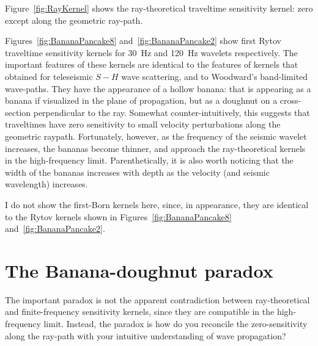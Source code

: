 \par
Figure~\ref{fig:RayKernel} shows the ray-theoretical traveltime
sensitivity kernel: zero except along the geometric ray-path.  

\par
Figures~\ref{fig:BananaPancake8} and~\ref{fig:BananaPancake2} show
first Rytov traveltime sensitivity kernels for 30~Hz and 120~Hz
wavelets respectively.  The important features of these kernels are
identical to the features of kernels that \cite{marquering99}
obtained for teleseismic $S-H$ wave scattering, and to Woodward's
 band-limited wave-paths.  They have the
appearance of a  hollow banana: that is appearing as a banana if
visualized in the plane of propagation, but as a doughnut on a
cross-section perpendicular to the ray.  
Somewhat counter-intuitively, this suggests that traveltimes
have zero sensitivity to small velocity perturbations along the
geometric raypath.  
Fortunately, however, as the frequency of the seismic wavelet increases,
the bananas become thinner, and approach the ray-theoretical kernels
in the high-frequency limit.
Parenthetically, it is also worth noticing that the width of the
bananas increases with depth as the velocity (and seismic wavelength)
increases. 

\par
I do not show the first-Born kernels here, since, in appearance, they 
are identical to the Rytov kernels shown in 
Figures~\ref{fig:BananaPancake8} and~\ref{fig:BananaPancake2}.

\section{The Banana-doughnut paradox}
The important paradox is not the apparent contradiction between
ray-theoretical and finite-frequency sensitivity kernels, 
since they are compatible in the high-frequency limit. 
Instead, the paradox is how do you reconcile the zero-sensitivity
along the ray-path with your intuitive understanding of wave
propagation? 

